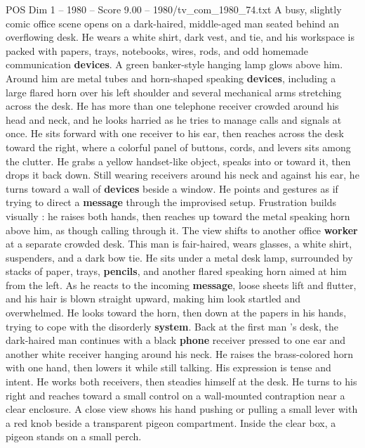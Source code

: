 \begin{textsample}{POS Dim 1 – 1980 – Score 9.00 – 1980/tv\_com\_1980\_74.txt}  \label{ex:f1_pos_053}
A busy, slightly comic office scene opens on a dark-haired, middle-aged man seated behind an overflowing desk.
He wears a white shirt, dark vest, and tie, and his workspace is packed with papers, trays, notebooks, wires, rods, and odd homemade communication \textbf{devices}.
A green banker-style hanging lamp glows above him.
Around him are metal tubes and horn-shaped speaking \textbf{devices}, including a large flared horn over his left shoulder and several mechanical arms stretching across the desk.
He has more than one telephone receiver crowded around his head and neck, and he looks harried as he tries to manage calls and signals at once.
He sits forward with one receiver to his ear, then reaches across the desk toward the right, where a colorful panel of buttons, cords, and levers sits among the clutter.
He grabs a yellow handset-like object, speaks into or toward it, then drops it back down.
Still wearing receivers around his neck and against his ear, he turns toward a wall of \textbf{devices} beside a window.
He points and gestures as if trying to direct a \textbf{message} through the improvised setup.
Frustration builds visually : he raises both hands, then reaches up toward the metal speaking horn above him, as though calling through it.
The view shifts to another office \textbf{worker} at a separate crowded desk.
This man is fair-haired, wears glasses, a white shirt, suspenders, and a dark bow tie.
He sits under a metal desk lamp, surrounded by stacks of paper, trays, \textbf{pencils}, and another flared speaking horn aimed at him from the left.
As he reacts to the incoming \textbf{message}, loose sheets lift and flutter, and his hair is blown straight upward, making him look startled and overwhelmed.
He looks toward the horn, then down at the papers in his hands, trying to cope with the disorderly \textbf{system}.
Back at the first man ’s desk, the dark-haired man continues with a black \textbf{phone} receiver pressed to one ear and another white receiver hanging around his neck.
He raises the brass-colored horn with one hand, then lowers it while still talking.
His expression is tense and intent.
He works both receivers, then steadies himself at the desk.
He turns to his right and reaches toward a small control on a wall-mounted contraption near a clear enclosure.
A close view shows his hand pushing or pulling a small lever with a red knob beside a transparent pigeon compartment.
Inside the clear box, a pigeon stands on a small perch.

\end{textsample}
